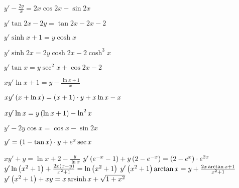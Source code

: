 	\begin{multicols}{2}
		\begin{enumtasks}

			\item \( y' - \frac{2y}{x} = 2x \cos{2x} - \sin{2x} \) 											%
			\item \( y'\tan{2x} - 2y = \tan{2x} - 2x - 2 \) 												%
			\item \( y' \sinh{x} + 1 = y \cosh{x} \) 														%
			\item \( y' \sinh{2x} = 2y \cosh{2x} - 2\cosh^3{x} \) 											%
			\item \( y' \tan{x} = y \sec^2{x} + \cos{2x} - 2 \) 											%
			\item \( xy' \ln{x} + 1 = y - \frac{\ln{x} + 1}{x} \) 											%
			\item \( xy' \left( x + \ln{x} \right) = \left( x + 1 \right) \cdot y + x \ln{x} - x \) 						%
			\item \( xy' \ln{x} = y \left( \ln{x} + 1 \right) - \ln^2{x} \) 										%
			\item \( y' - 2y \cos{x} = \cos{x} - \sin{2x} \) 												%
			\item \( y' = \left( 1 - \tan{x} \right) \cdot y + e^{x} \sec{x} \) 									%
			\item \( xy' + y = \ln{x} + 2 - \frac{y}{\ln{x}} \) 											%
			\itemstar \( y' \left( e^{-x} - 1 \right) + y \left( 2 - e^{-x} \right) = \left( 2 - e^{x} \right) \cdot e^{2x} \) 	%
			\itemstar \( y' \ln\left( x^2 + 1 \right) + \frac{2x \left( x - y \right)}{x^2 + 1} = \ln\left( x^2 + 1 \right) \) 	%
			\itemstar \( y' \left( x^2 + 1 \right) \arctan{x} = y + \frac{2x \arctan{x} + 1}{x^2 + 1} \) 			%
			\itemstar \( y' \left( x^2 + 1 \right) + xy = x \operatorname{arsinh}{x} + \sqrt{1 + x^2} \) 						%

		\end{enumtasks}
	\end{multicols}

